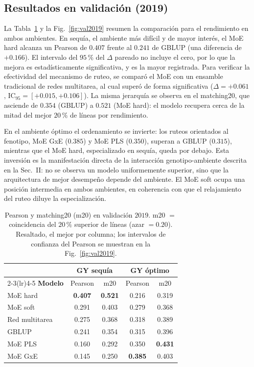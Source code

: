 \documentclass[conference]{IEEEtran}
\begin{document}
\subsection{Resultados en validación (2019)}
La Tabla~\ref{tab:val2019} y la Fig.~\ref{fig:val2019} resumen la comparación para el rendimiento en ambos ambientes. En sequía, el ambiente más difícil y de mayor interés, el MoE hard alcanza un Pearson de $0.407$ frente al $0.241$ de GBLUP (una diferencia de $+0.166$). El intervalo del $95\,\%$ del $\Delta$ pareado no incluye el cero, por lo que la mejora es estadísticamente significativa, y es la mayor registrada. Para verificar la efectividad del mecanismo de ruteo, se comparó el MoE con un ensamble tradicional de redes multitarea, al cual superó de forma significativa ($\Delta=+0.061$, IC$_{95}=[+0.015,+0.106]$). La misma jerarquía se observa en el matching20, que asciende de $0.354$ (GBLUP) a $0.521$ (MoE hard): el modelo recupera cerca de la mitad del mejor $20\,\%$ de líneas por rendimiento.

En el ambiente óptimo el ordenamiento se invierte: los ruteos orientados al fenotipo, MoE GxE ($0.385$) y MoE PLS ($0.350$), superan a GBLUP ($0.315$), mientras que el MoE hard, especializado en sequía, queda por debajo. Esta inversión es la manifestación directa de la interacción genotipo-ambiente descrita en la Sec.~II: no se observa un modelo uniformemente superior, sino que la arquitectura de mejor desempeño depende del ambiente. El MoE soft ocupa una posición intermedia en ambos ambientes, en coherencia con que el relajamiento del ruteo diluye la especialización.

\begin{table}[!t]
\renewcommand{\arraystretch}{1.2}
\caption{Pearson y matching20 (m20) en validación $2019$. m20 $=$ coincidencia del $20\,\%$ superior de líneas (azar $=0.20$). Resaltado, el mejor por columna; los intervalos de confianza del Pearson se muestran en la Fig.~\ref{fig:val2019}.}
\label{tab:val2019}
\centering
\footnotesize
\begin{tabular}{lcccc}
\toprule
 & \multicolumn{2}{c}{\textbf{GY sequía}} & \multicolumn{2}{c}{\textbf{GY óptimo}} \\
\cmidrule(lr){2-3}\cmidrule(lr){4-5}
\textbf{Modelo} & Pearson & m20 & Pearson & m20 \\
\midrule
MoE hard        & \textbf{0.407} & \textbf{0.521} & 0.216 & 0.319 \\
MoE soft        & 0.291 & 0.403 & 0.279 & 0.368 \\
Red multitarea  & 0.275 & 0.368 & 0.318 & 0.389 \\
GBLUP           & 0.241 & 0.354 & 0.315 & 0.396 \\
MoE PLS         & 0.160 & 0.292 & 0.350 & \textbf{0.431} \\
MoE GxE         & 0.145 & 0.250 & \textbf{0.385} & 0.403 \\
\bottomrule
\end{tabular}
\end{table}
\end{document}
